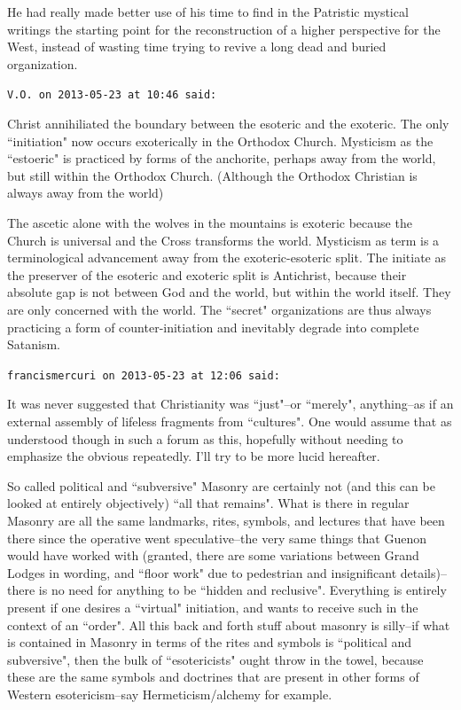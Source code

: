 \begin{footnotesize}
\begin{sffamily}
He had really made better use of his time to find in the Patristic mystical writings the starting point for the reconstruction of a higher perspective for the West, instead of wasting time trying to revive a long dead and buried organization.


\hfill

\texttt{V.O. on 2013-05-23 at 10:46 said: }

Christ annihiliated the boundary between the esoteric and the exoteric. The only ``initiation" now occurs exoterically in the Orthodox Church. Mysticism as the ``estoeric" is practiced by forms of the anchorite, perhaps away from the world, but still within the Orthodox Church. (Although the Orthodox Christian is always away from the world)

The ascetic alone with the wolves in the mountains is exoteric because the Church is universal and the Cross transforms the world. Mysticism as term is a terminological advancement away from the exoteric-esoteric split. The initiate as the preserver of the esoteric and exoteric split is Antichrist, because their absolute gap is not between God and the world, but within the world itself. They are only concerned with the world. The ``secret" organizations are thus always practicing a form of counter-initiation and inevitably degrade into complete Satanism.


\hfill

\texttt{francismercuri on 2013-05-23 at 12:06 said: }

It was never suggested that Christianity was ``just"–or ``merely", anything–as if an external assembly of lifeless fragments from ``cultures". One would assume that as understood though in such a forum as this, hopefully without needing to emphasize the obvious repeatedly. I'll try to be more lucid hereafter.

So called political and ``subversive" Masonry are certainly not (and this can be looked at entirely objectively) ``all that remains". What is there in regular Masonry are all the same landmarks, rites, symbols, and lectures that have been there since the operative went speculative–the very same things that Guenon would have worked with (granted, there are some variations between Grand Lodges in wording, and ``floor work" due to pedestrian and insignificant details)–there is no need for anything to be ``hidden and reclusive". Everything is entirely present if one desires a ``virtual" initiation, and wants to receive such in the context of an ``order". All this back and forth stuff about masonry is silly–if what is contained in Masonry in terms of the rites and symbols is ``political and subversive", then the bulk of ``esotericists" ought throw in the towel, because these are the same symbols and doctrines that are present in other forms of Western esotericism–say Hermeticism/alchemy for example. 


\end{sffamily}
\end{footnotesize}
